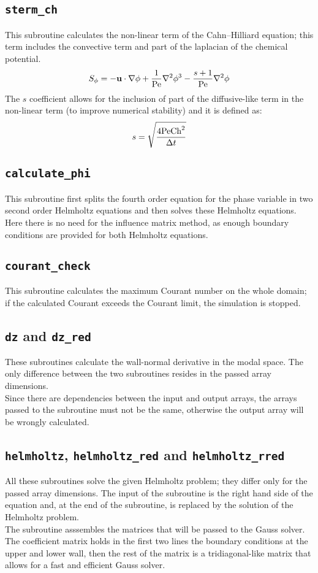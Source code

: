 \subsection{\texttt{sterm\_ch}}
This subroutine calculates the non-linear term of the Cahn--Hilliard equation; this term includes the convective term and part of the laplacian of the chemical potential. 
\[
S_\phi=-\mathbf{u}\cdot\nabla\phi+\frac{1}{\textnormal{Pe}}\nabla^2\phi^3-\frac{s+1}{\textnormal{Pe}}\nabla^2\phi
\]
The $s$ coefficient allows for the inclusion of part of the diffusive-like term in the non-linear term (to improve numerical stability) and it is defined as:
\[
s=\sqrt{\frac{4\textnormal{Pe}\textnormal{Ch}^2}{\Delta t}}
\]

\subsection{\texttt{calculate\_phi}}
This subroutine first splits the fourth order equation for the phase variable in two second order Helmholtz equations and then solves these Helmholtz equations. Here there is no need for the influence matrix method, as enough boundary conditions are provided for both Helmholtz equations.

\subsection{\texttt{courant\_check}}
This subroutine calculates the maximum Courant number on the whole domain; if the calculated Courant exceeds the Courant limit, the simulation is stopped.

\subsection{\texttt{dz} and \texttt{dz\_red}}
These subroutines calculate the wall-normal derivative in the modal space. The only difference between the two subroutines resides in the passed array dimensions.\\
Since there are dependencies between the input and output arrays, the arrays passed to the subroutine must not be the same, otherwise the output array will be wrongly calculated.

\subsection{\texttt{helmholtz}, \texttt{helmholtz\_red} and \texttt{helmholtz\_rred}}
All these subroutines solve the given Helmholtz problem; they differ only for the passed array dimensions. The input of the subroutine is the right hand side of the equation and, at the end of the subroutine, is replaced by the solution of the Helmholtz problem.\\
The subroutine asssembles the matrices that will be passed to the Gauss solver. The coefficient matrix holds in the first two lines the boundary conditions at the upper and lower wall, then the rest of the matrix is a tridiagonal-like matrix that allows for a fast and efficient Gauss solver.

